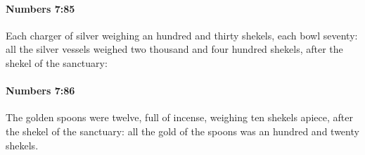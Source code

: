 		\paragraph{Numbers 7:85} %
			\label{NUMBERS-7-85}

			Each charger of silver weighing an hundred and thirty shekels, each bowl seventy: all the silver vessels weighed two thousand and four hundred shekels, after the shekel of the sanctuary:


		\paragraph{Numbers 7:86} %
			\label{NUMBERS-7-86}

			The golden spoons were twelve, full of incense, weighing ten shekels apiece, after the shekel of the sanctuary: all the gold of the spoons was an hundred and twenty shekels.


